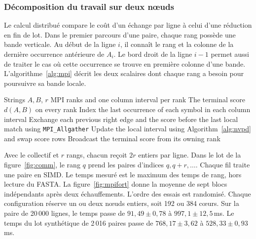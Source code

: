 \subsubsection{Décomposition du travail sur deux nœuds}
Le calcul distribué compare le coût d'un échange par ligne à celui d'une réduction en fin de lot. Dans le premier parcours d’une paire, chaque rang possède une bande verticale. Au début de la ligne \(i\), il connaît le rang et la colonne de la dernière occurrence antérieure de \(A_i\). Le bord droit de la ligne \(i-1\) permet aussi de traiter le cas où cette occurrence se trouve en première colonne d'une bande.
L'algorithme~\ref{alg:mpi} décrit les deux scalaires dont chaque rang a besoin pour poursuivre sa bande locale.
\begin{algorithm}[!htbp]
\caption{Décomposition MPI d'une paire par bandes de colonnes}\label{alg:mpi}
\begin{algorithmic}[1]
\Require Strings \(A,B\), \(r\) MPI ranks and one column interval per rank
\Ensure The terminal score \(d(A,B)\) on every rank
\State Index the last occurrence of each symbol in each column interval
  \State Exchange each previous right edge and the score before the last local match using \texttt{MPI\_Allgather}
  \State Update the local interval using Algorithm~\ref{alg:nvpd} and swap score rows
\EndFor
\State Broadcast the terminal score from its owning rank
\end{algorithmic}
\end{algorithm}
Avec le collectif et \(r\) rangs, chacun reçoit \(2r\) entiers par ligne. Dans le lot de la figure~\ref{fig:comm}, le rang \(q\) prend les paires d'indices \(q,q+r,\ldots\). Chaque fil traite une paire en SIMD. Le temps mesuré est le maximum des temps de rang, hors lecture du FASTA.
La figure~\ref{fig:mpifort} donne la moyenne de sept blocs indépendants après deux échauffements. L’ordre des essais est randomisé. Chaque configuration réserve un ou deux nœuds entiers, soit 192 ou 384 cœurs. Sur la paire de 20\,000 lignes, le temps passe de \(91{,}49\pm0{,}78\) à \(997{,}1\pm12{,}5\)\,ms. Le temps du lot synthétique de 2\,016 paires passe de \(768{,}17\pm3{,}62\) à \(528{,}33\pm0{,}93\)\,ms.

